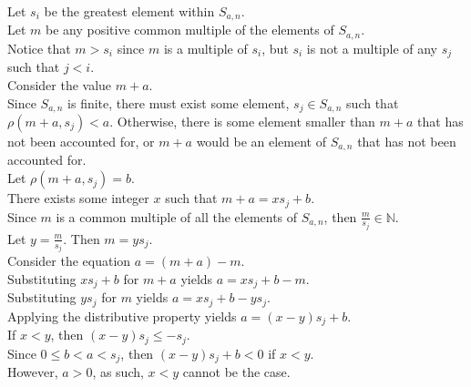 \documentclass[a4paper,12pt]{article}
\begin{document}
\noindent Let $s_i$ be the greatest element within $S_{a, n}$.\\

\noindent Let $m$ be any positive common multiple of the elements of $S_{a, n}$.\\

\noindent Notice that $m > s_i$ since $m$ is a multiple of $s_i$, but $s_i$ is not a multiple of any $s_j$ such that $j < i$.\\

\noindent Consider the value $m + a$.\\

\noindent Since $S_{a, n}$ is finite, there must exist some element, $s_j \in S_{a,n}$ such that $\rho(m + a, s_j) < a$. Otherwise, there is some element smaller than $m + a$ that has not been accounted for, or $m + a$ would be an element of $S_{a, n}$ that has not been accounted for.\\

\noindent Let $\rho(m + a, s_j) = b$.\\

\noindent There exists some integer $x$ such that $m + a = xs_j + b$.\\

\noindent Since $m$ is a common multiple of all the elements of $S_{a,n}$, then $\frac{m}{s_j} \in \mathbb{N}$.\\

\noindent Let $y = \frac{m}{s_j}$. Then $m = ys_j$.\\

\noindent Consider the equation $a = (m + a) - m$.\\

\noindent Substituting $xs_j + b$ for $m + a$ yields $a = xs_j + b - m$.\\

\noindent Substituting $ys_j$ for $m$ yields $a = xs_j + b - ys_j$.\\

\noindent Applying the distributive property yields $a = (x - y)s_j + b$.\\

\noindent If $x < y$, then $(x - y)s_j \leq -s_j$.\\

\noindent Since $0 \leq b < a < s_j$, then $(x - y)s_j + b < 0$ if $x < y$.\\

\noindent However, $a > 0$, as such, $x < y$ cannot be the case.\\
\end{document}

